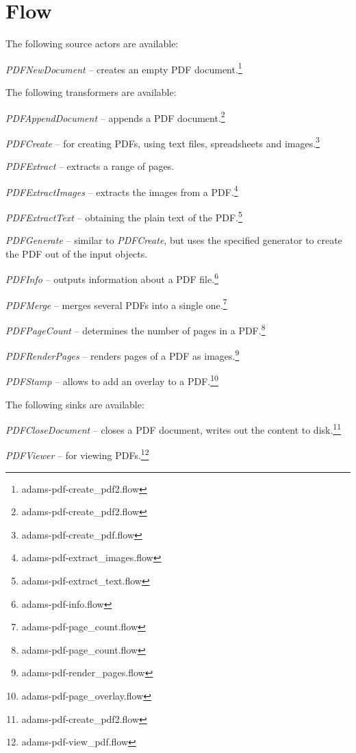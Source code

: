 \documentclass[a4paper]{book}
\begin{document}
\chapter{Flow}
The following source actors are available:
\begin{tight_itemize}
	\item \textit{PDFNewDocument} -- creates an empty PDF document.\footnote{adams-pdf-create\_pdf2.flow}
\end{tight_itemize}
The following transformers are available:
\begin{tight_itemize}
	\item \textit{PDFAppendDocument} -- appends a PDF document.\footnote{adams-pdf-create\_pdf2.flow}
	\item \textit{PDFCreate} -- for creating PDFs, using text files,
	spreadsheets and images.\footnote{adams-pdf-create\_pdf.flow}
	\item \textit{PDFExtract} -- extracts a range of pages.
	\item \textit{PDFExtractImages} -- extracts the images from a PDF.\footnote{adams-pdf-extract\_images.flow}
	\item \textit{PDFExtractText} -- obtaining the plain text of the PDF.\footnote{adams-pdf-extract\_text.flow}
	\item \textit{PDFGenerate} -- similar to \textit{PDFCreate}, but uses the specified generator
	to create the PDF out of the input objects.
	\item \textit{PDFInfo} -- outputs information about a PDF file.\footnote{adams-pdf-info.flow}
	\item \textit{PDFMerge} -- merges several PDFs into a single one.\footnote{adams-pdf-page\_count.flow}
	\item \textit{PDFPageCount} -- determines the number of pages in a
	PDF.\footnote{adams-pdf-page\_count.flow}
	\item \textit{PDFRenderPages} -- renders pages of a PDF as images.\footnote{adams-pdf-render\_pages.flow}
	\item \textit{PDFStamp} -- allows to add an overlay to a PDF.\footnote{adams-pdf-page\_overlay.flow}
\end{tight_itemize}
The following sinks are available:
\begin{tight_itemize}
	\item \textit{PDFCloseDocument} -- closes a PDF document, writes out the content
	to disk.\footnote{adams-pdf-create\_pdf2.flow}
	\item \textit{PDFViewer} -- for viewing PDFs.\footnote{adams-pdf-view\_pdf.flow}
\end{tight_itemize}
\end{document}
